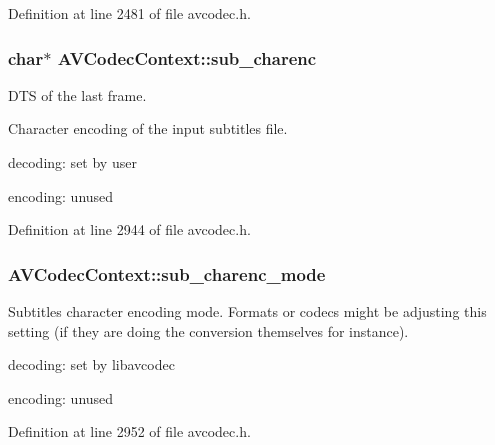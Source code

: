 Definition at line 2481 of file avcodec.\+h.

\subsubsection[{\texorpdfstring{sub\+\_\+charenc}{sub_charenc}}]{\setlength{\rightskip}{0pt plus 5cm}char$\ast$ A\+V\+Codec\+Context\+::sub\+\_\+charenc}\hypertarget{struct_a_v_codec_context_a25710250c5d1319ba14ee7f3112a8aa2}{}\label{struct_a_v_codec_context_a25710250c5d1319ba14ee7f3112a8aa2}


D\+TS of the last frame. 

Character encoding of the input subtitles file.
\begin{DoxyItemize}
\item decoding\+: set by user
\item encoding\+: unused 
\end{DoxyItemize}

Definition at line 2944 of file avcodec.\+h.

\subsubsection[{\texorpdfstring{sub\+\_\+charenc\+\_\+mode}{sub_charenc_mode}}]{ A\+V\+Codec\+Context\+::sub\+\_\+charenc\+\_\+mode}\hypertarget{struct_a_v_codec_context_a62b675cebedf1e64ca7faecbb23d30a5}{}\label{struct_a_v_codec_context_a62b675cebedf1e64ca7faecbb23d30a5}
Subtitles character encoding mode. Formats or codecs might be adjusting this setting (if they are doing the conversion themselves for instance).
\begin{DoxyItemize}
\item decoding\+: set by libavcodec
\item encoding\+: unused 
\end{DoxyItemize}

Definition at line 2952 of file avcodec.\+h.

